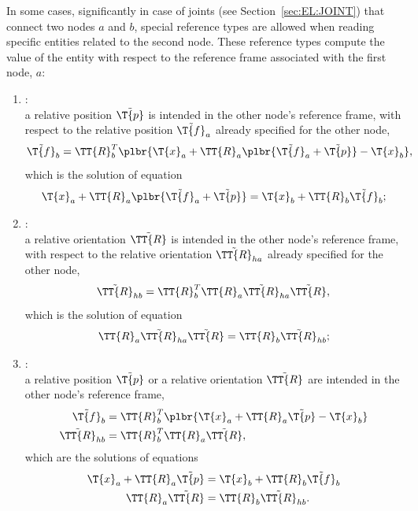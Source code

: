 In some cases, significantly in case of joints (see Section~\ref{sec:EL:JOINT}) that connect two nodes
$a$ and $b$, special reference types are allowed
when reading specific entities related to the second node.
These reference types compute the value of the entity with respect
to the reference frame associated with the first node, $a$:
\begin{enumerate}
\item {}: \\
	a relative position $\tilde{\T{p}}$ is intended in the other node's
	reference frame, with respect to the relative position $\tilde{\T{f}}_a$
	already specified for the other node,
\begin{equation}
	\tilde{\T{f}}_b = \TT{R}_b^T\plbr{
		\T{x}_a + \TT{R}_a \plbr{
			\tilde{\T{f}}_a
			+ \tilde{\T{p}}
		}
		- \T{x}_b
	} ,
\end{equation}
	which is the solution of equation
\begin{equation}
	\T{x}_a + \TT{R}_a \plbr{\tilde{\T{f}}_a + \tilde{\T{p}}}
	= \T{x}_b + \TT{R}_b \tilde{\T{f}}_b ;
\end{equation}

\item {}: \\
	a relative orientation $\tilde{\TT{R}} $ is intended in the other node's
	reference frame, with respect to the relative orientation
	$\tilde{\TT{R}}_{ha}$ already specified for the other node,
\begin{equation}
	\tilde{\TT{R}}_{hb} = \TT{R}_b^T \TT{R}_a \tilde{\TT{R}}_{ha} \tilde{\TT{R}} ,
\end{equation}
	which is the solution of equation
\begin{equation}
	\TT{R}_a \tilde{\TT{R}}_{ha} \tilde{\TT{R}}
	= \TT{R}_b \tilde{\TT{R}}_{hb} ;
\end{equation}

\item {}: \\
	a relative position $\tilde{\T{p}}$
	or a relative orientation $\tilde{\TT{R}}$
	are intended in the other node's reference frame,
\begin{subequations}
\begin{align}
	\tilde{\T{f}}_b &= \TT{R}_b^T\plbr{
		\T{x}_a + \TT{R}_a \tilde{\T{p}}
		- \T{x}_b
	} \\
	\tilde{\TT{R}}_{hb} &= \TT{R}_b^T \TT{R}_a \tilde{\TT{R}} ,
\end{align}
\end{subequations}
	which are the solutions of equations
\begin{subequations}
\begin{align}
	\T{x}_a + \TT{R}_a \tilde{\T{p}}
	&= \T{x}_b + \TT{R}_b \tilde{\T{f}}_b \\
	\TT{R}_a \tilde{\TT{R}}
	&= \TT{R}_b \tilde{\TT{R}}_{hb} .
\end{align}
\end{subequations}
\end{enumerate}

